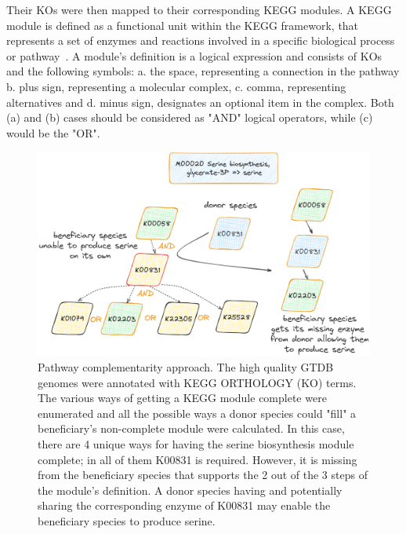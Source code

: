 \documentclass[sn-mathphys,Numbered]{sn-jnl}%
\theoremstyle{thmstyleone}%
\theoremstyle{thmstyletwo}%
\theoremstyle{thmstylethree}%
\begin{document}
        Their KOs were then mapped to their corresponding KEGG modules.
        A KEGG module is defined as a functional unit within the KEGG framework, that represents a set of enzymes and reactions involved in a specific biological process or pathway~\cite{muto2013modular}.
        A module's definition is a logical expression and consists of KOs and the following symbols:
        a. the space, representing a connection in the pathway
        b. plus sign, representing a molecular complex,  
        c. comma, representing alternatives and
        d. minus sign, designates an optional item in the complex.
        Both (a) and (b) cases should be considered as "AND" logical operators, while (c) would be the "OR".



        \begin{figure}[h!]
            \label{fig:path-compl}
            \includegraphics*[width=0.9\columnwidth]{figs/path_complem.png}
            \caption{
                Pathway complementarity approach. 
                The high quality GTDB genomes were annotated with KEGG ORTHOLOGY (KO) terms.
                The various ways of getting a KEGG module complete were enumerated and all the possible ways a donor species
                could "fill" a beneficiary's non-complete module were calculated. 
                In this case, there are 4 unique ways for having the serine biosynthesis module complete; in all of them K00831 is required. 
                However, it is missing from the beneficiary species that supports the 2 out of the 3 steps of the module's definition.
                A donor species having and potentially sharing the corresponding enzyme of K00831 may enable the beneficiary species to 
                produce serine.
            }
        \end{figure}
\end{document}
